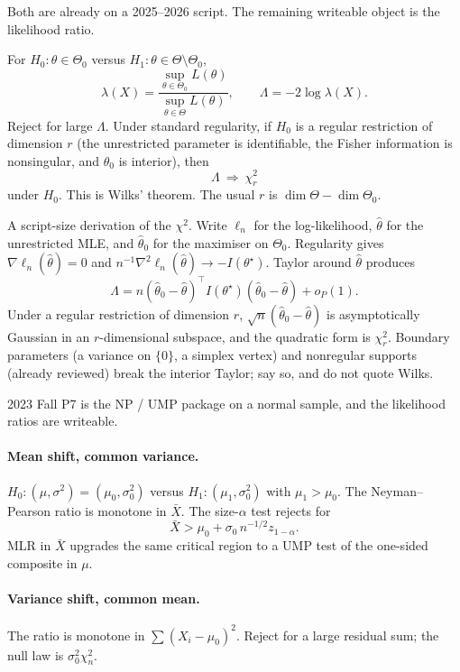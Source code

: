 Both are already on a 2025--2026 script. The remaining writeable object is the likelihood ratio.

\begin{definition}
\label{def:lrt}
For \(H_{0}:\theta\in\Theta_{0}\) versus \(H_{1}:\theta\in\Theta\setminus\Theta_{0}\),
\[
\lambda(X)=\frac{\sup_{\theta\in\Theta_{0}}L(\theta)}{\sup_{\theta\in\Theta}L(\theta)},
\qquad
\Lambda=-2\log\lambda(X).
\]
Reject for large \(\Lambda\). Under standard regularity, if \(H_{0}\) is a regular restriction of dimension \(r\) (the unrestricted parameter is identifiable, the Fisher information is nonsingular, and \(\theta_{0}\) is interior), then
\[
\Lambda\ \Rightarrow\ \chi^{2}_{r}
\]
under \(H_{0}\). This is Wilks' theorem. The usual \(r\) is \(\dim\Theta-\dim\Theta_{0}\).
\end{definition}

A script-size derivation of the \(\chi^{2}\). Write \(\ell_{n}\) for the log-likelihood, \(\hat\theta\) for the unrestricted MLE, and \(\hat\theta_{0}\) for the maximiser on \(\Theta_{0}\). Regularity gives \(\nabla\ell_{n}(\hat\theta)=0\) and \(n^{-1}\nabla^{2}\ell_{n}(\hat\theta)\to -I(\theta^{\star})\). Taylor around \(\hat\theta\) produces
\[
\Lambda
=
n(\hat\theta_{0}-\hat\theta)^{\top}I(\theta^{\star})(\hat\theta_{0}-\hat\theta)
+
o_{P}(1).
\]
Under a regular restriction of dimension \(r\), \(\sqrt{n}(\hat\theta_{0}-\hat\theta)\) is asymptotically Gaussian in an \(r\)-dimensional subspace, and the quadratic form is \(\chi^{2}_{r}\). Boundary parameters (a variance on \(\{0\}\), a simplex vertex) and nonregular supports (already reviewed) break the interior Taylor; say so, and do not quote Wilks.

2023 Fall P7 is the NP / UMP package on a normal sample, and the likelihood ratios are writeable.

\paragraph{Mean shift, common variance.}
\(H_{0}:(\mu,\sigma^{2})=(\mu_{0},\sigma_{0}^{2})\) versus \(H_{1}:(\mu_{1},\sigma_{0}^{2})\) with \(\mu_{1}>\mu_{0}\). The Neyman--Pearson ratio is monotone in \(\bar X\). The size-\(\alpha\) test rejects for
\[
\bar X
>
\mu_{0}
+
\sigma_{0}\,n^{-1/2}z_{1-\alpha}.
\]
MLR in \(\bar X\) upgrades the same critical region to a UMP test of the one-sided composite in \(\mu\).

\paragraph{Variance shift, common mean.}
The ratio is monotone in \(\sum(X_{i}-\mu_{0})^{2}\). Reject for a large residual sum; the null law is \(\sigma_{0}^{2}\chi^{2}_{n}\).

